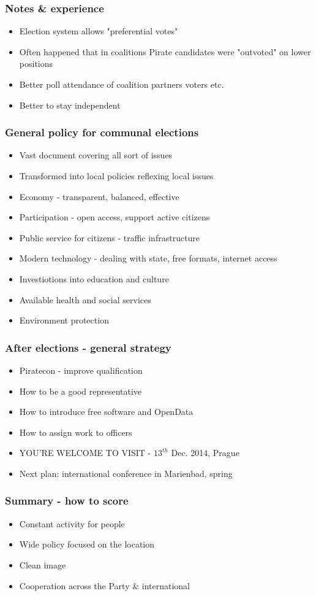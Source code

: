 \begin{frame}
	\frametitle{Notes \& experience}
	\begin{itemize}
		\item Election system allows "preferential votes"
		\item Often happened that in coalitions Pirate candidates were "outvoted" on lower positions
		\item Better poll attendance of coalition partners voters etc.
		\item Better to stay independent
	\end{itemize}
\end{frame}
\begin{frame}
	\frametitle{General policy for communal elections}
	\begin{itemize}
		\item Vast document covering all sort of issues
		\item Transformed into local policies reflexing local issues
		\item Economy - transparent, balanced, effective
		\item Participation - open access, support active citizens
		\item Public service for citizens - traffic infrastructure
		\item Modern technology - dealing with state, free formats, internet access
		\item Investiotions into education and culture
		\item Available health and social services
		\item Environment protection
	\end{itemize}
\end{frame}
\begin{frame}
	\frametitle{After elections - general strategy}
	\begin{itemize}
		\item Piratecon - improve qualification
		\item How to be a good representative
		\item How to introduce free software and OpenData
		\item How to assign work to officers
		\item YOU'RE WELCOME TO VISIT - $13^{th}$ Dec. 2014, Prague
		\item Next plan: international conference in Marienbad, spring
	\end{itemize}
\end{frame}
\begin{frame}
	\frametitle{Summary - how to score}
	\begin{itemize}
		\item Constant activity for people
		\item Wide policy focused on the location
		\item Clean image
		\item Cooperation across the Party \& international
	\end{itemize}
\end{frame}
